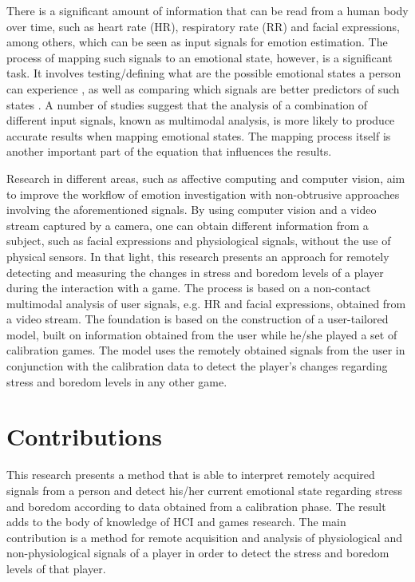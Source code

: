 There is a significant amount of information that can be read from a human body over time, such as heart rate (HR), respiratory rate (RR) and facial expressions, among others, which can be seen as input signals for emotion estimation. The process of mapping such signals to an emotional state, however, is a significant task. It involves testing/defining what are the possible emotional states a person can experience \cite{mandryk2006continuous}, as well as comparing which signals are better predictors of such states \cite{jerritta2011physiological}. A number of studies \cite{kukolja2014comparative} suggest that the analysis of a combination of different input signals, known as multimodal analysis, is more likely to produce accurate results when mapping emotional states. The mapping process itself is another important part of the equation that influences the results.

Research in different areas, such as affective computing and computer vision, aim to improve the workflow of emotion investigation with non-obtrusive approaches involving the aforementioned signals. By using computer vision and a video stream captured by a camera, one can obtain different information from a subject, such as facial expressions and physiological signals, without the use of physical sensors. In that light, this research presents an approach for remotely detecting and measuring the changes in stress and boredom levels of a player during the interaction with a game. The process is based on a non-contact multimodal analysis of user signals, e.g. HR and facial expressions, obtained from a video stream. The foundation is based on the construction of a user-tailored model, built on information obtained from the user while he/she played a set of calibration games. The model uses the remotely obtained signals from the user in conjunction with the calibration data to detect the player's changes regarding stress and boredom levels in any other game.

\section{Contributions}

This research presents a method that is able to interpret remotely acquired signals from a person and detect his/her current emotional state regarding stress and boredom according to data obtained from a calibration phase. The result adds to the body of knowledge of HCI and games research. The main contribution is a method for remote acquisition and analysis of physiological and non-physiological signals of a player in order to detect the stress and boredom levels of that player.

